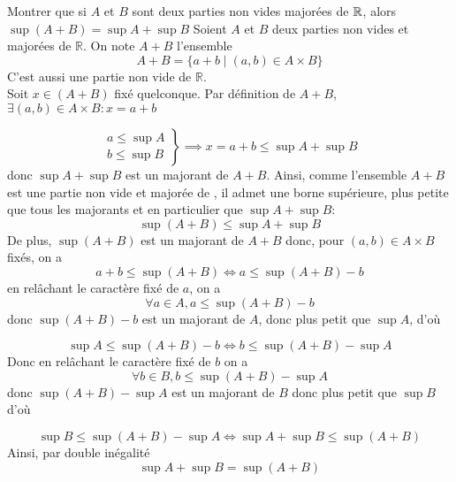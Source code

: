 \documentclass{article}
\date{24 Novembre 2024}
\begin{document}
\maketitle

\begin{question_kholle}[]{Montrer que si $A$ et $B$ sont deux parties non vides majorées de $\mathbb R$, alors $\sup(A+B) = \sup A + \sup B$}
  Soient $A$ et $B$ deux parties non vides et majorées de $\mathbb{R}$. On note $A+B$ l'ensemble
  $$
    A+B = \{ a+b \mid (a, b) \in A\times B \}
  $$
  C'est aussi une partie non vide de $\mathbb{R}$.\\
  Soit $x \in (A+B)$ fixé quelconque. Par définition de $A+B$, $\exists(a, b) \in A\times B : x=a+b$

  $$
    \left. \begin{array}{ll}
      a \leqslant \sup A \\
      b \leqslant \sup B
    \end{array}\right\} \implies x = a+b \leqslant \sup A + \sup B
  $$
  donc $\sup A+\sup B$ est un majorant de $A+B$. Ainsi, comme l’ensemble $A+B$ est une partie non vide et majorée de \R, il admet une borne supérieure, plus petite que tous les majorants et en particulier que $\sup A+\sup B$:
  $$\sup(A+B) \leqslant \sup A + \sup B$$
  De plus, $\sup(A+B)$ est un majorant de $A+B$ donc, pour $(a, b) \in A\times B$ fixés, on a
  $$
    a+b \leqslant \sup (A+B) \iff a \leqslant \sup(A+B) -b
  $$
  en relâchant le caractère fixé de $a$, on a
  $$
    \forall a \in A, a\leqslant \sup(A+B) - b
  $$
  donc $\sup(A+B) - b$ est un majorant de $A$, donc plus petit que $\sup A$, d'où

  $$
    \sup A \leqslant \sup(A+B) - b \iff b \leqslant \sup(A+B) - \sup A
  $$
  Donc en relâchant le caractère fixé de $b$ on a
  $$
    \forall b \in B, b\leqslant \sup(A+B) - \sup A
  $$
  donc $\sup(A+B) - \sup A$ est un majorant de $B$ donc plus petit que $\sup B$
  d'où

  $$
    \sup B \leqslant \sup(A+B) - \sup A \iff \sup A + \sup B \leqslant \sup (A+B)
  $$
  Ainsi, par double inégalité
  $$
    \sup A + \sup B = \sup (A+B)
  $$

\end{question_kholle}
\end{document}
